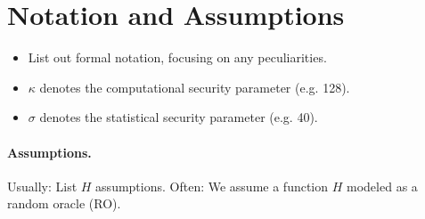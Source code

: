 \section{Notation and Assumptions}\label{sec:notation}

\begin{itemize}
  \item List out formal notation, focusing on any peculiarities.
  \item $\kappa$ denotes the computational security parameter (e.g.
    128).
  \item $\sigma$ denotes the statistical security parameter (e.g. 40).
\end{itemize}

\paragraph{Assumptions.}
Usually: List $H$ assumptions.
Often: We assume a function $H$ modeled as a random oracle (RO).
